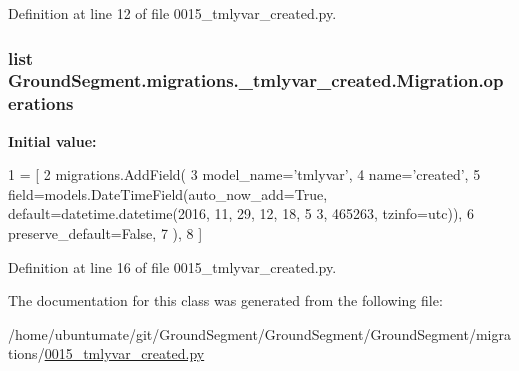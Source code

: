 Definition at line 12 of file 0015\+\_\+tmlyvar\+\_\+created.\+py.

\hypertarget{class_ground_segment_1_1migrations_1_10015__tmlyvar__created_1_1_migration_a698cdca785e05aa4eaa217d3b238d164}{}
\subsubsection[{operations}]{\setlength{\rightskip}{0pt plus 5cm}list Ground\+Segment.\+migrations.\+\_\+tmlyvar\+\_\+created.\+Migration.\+operations\hspace{0.3cm}{\ttfamily [static]}}\label{class_ground_segment_1_1migrations_1_10015__tmlyvar__created_1_1_migration_a698cdca785e05aa4eaa217d3b238d164}
{\bfseries Initial value\+:}
\begin{DoxyCode}
1 = [
2         migrations.AddField(
3             model\_name=\textcolor{stringliteral}{'tmlyvar'},
4             name=\textcolor{stringliteral}{'created'},
5             field=models.DateTimeField(auto\_now\_add=\textcolor{keyword}{True}, default=datetime.datetime(2016, 11, 29, 12, 18, 5
      3, 465263, tzinfo=utc)),
6             preserve\_default=\textcolor{keyword}{False},
7         ),
8     ]
\end{DoxyCode}


Definition at line 16 of file 0015\+\_\+tmlyvar\+\_\+created.\+py.



The documentation for this class was generated from the following file\+:\begin{DoxyCompactItemize}
\item 
/home/ubuntumate/git/\+Ground\+Segment/\+Ground\+Segment/\+Ground\+Segment/migrations/\hyperlink{0015__tmlyvar__created_8py}{0015\+\_\+tmlyvar\+\_\+created.\+py}\end{DoxyCompactItemize}
